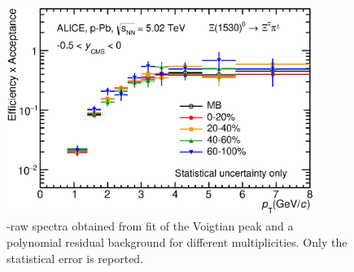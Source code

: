 \begin{figure}[htbp]
\begin{center}
\includegraphics[width=10.0cm]{./Version1/FigChapter5/MC/Efficiency.eps}
\caption{\xis-raw spectra obtained from fit of the Voigtian peak and a polynomial residual background for different multiplicities. Only the statistical error is reported.} 
 \label{fig:pPb:efficiency}
\end{center}
\end{figure}



